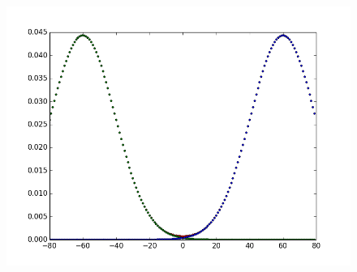 \documentclass{article}
\begin{document}
\begin{figure}[!ht] 
 \centering 
 \includegraphics[scale=0.5]{gauss.png} 
\end{figure} 
 
\end{document}
